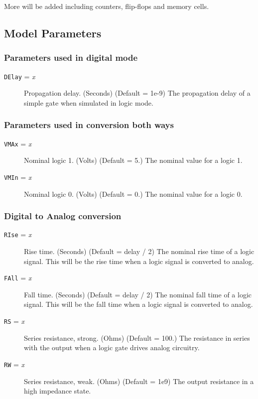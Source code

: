 More will be added including counters, flip-flops and memory cells.
\subsection{Model Parameters}

\subsubsection{Parameters used in digital mode}
\begin{description}

\item[{\tt DElay} = {\it x}] Propagation delay.  (Seconds) (Default = 1e-9)
The propagation delay of a simple gate when simulated in logic mode.

\end{description}
\subsubsection{Parameters used in conversion both ways}
\begin{description}

\item[{\tt VMAx} = {\it x}] Nominal logic 1.  (Volts) (Default = 5.) The
nominal value for a logic 1.

\item[{\tt VMIn} = {\it x}] Nominal logic 0.  (Volts) (Default = 0.) The
nominal value for a logic 0.

\end{description}
\subsubsection{Digital to Analog conversion}
\begin{description}

\item[{\tt RIse} = {\it x}] Rise time. (Seconds) (Default = delay / 2) The
nominal rise time of a logic signal.  This will be the rise time when a
logic signal is converted to analog.

\item[{\tt FAll} = {\it x}] Fall time. (Seconds) (Default = delay / 2) The
nominal fall time of a logic signal.  This will be the fall time when a
logic signal is converted to analog.

\item[{\tt RS} = {\it x}] Series resistance, strong. (Ohms) (Default =
100.)  The resistance in series with the output when a logic gate drives
analog circuitry.

\item[{\tt RW} = {\it x}] Series resistance, weak. (Ohms) (Default = 1e9)
The output resistance in a high impedance state.

\end{description}
